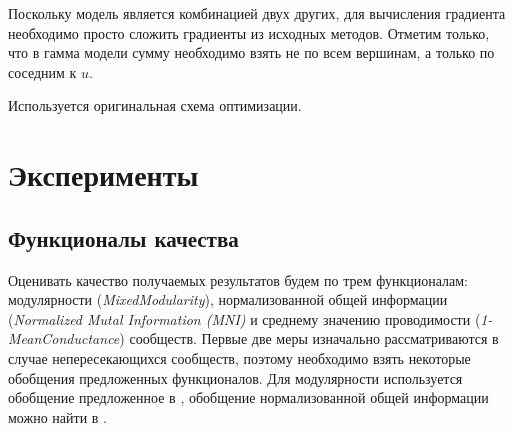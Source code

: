\documentclass{ITaSconf}
\begin{document}
	Поскольку модель является комбинацией двух других, для вычисления градиента необходимо просто сложить градиенты из исходных методов.
	Отметим только, что в гамма модели сумму необходимо взять не по всем вершинам, а только по соседним к $u$.
	
	Используется оригинальная схема оптимизации.
	
	\section{Эксперименты}
	
	\subsection{Функционалы качества}
	Оценивать качество получаемых результатов будем по трем функционалам: модулярности (\textit{MixedModularity}), нормализованной общей информации (\textit{Normalized Mutal Information (MNI)} и среднему значению проводимости (\textit{1-MeanConductance}) сообществ.
	Первые две меры изначально рассматриваются в случае непересекающихся сообществ, поэтому необходимо взять некоторые обобщения предложенных функционалов. Для модулярности используется обобщение предложенное в \cite{xie2013overlapping}, обобщение нормализованной общей информации можно найти в \cite{lancichinetti2009detecting}. 
	
\end{document}
